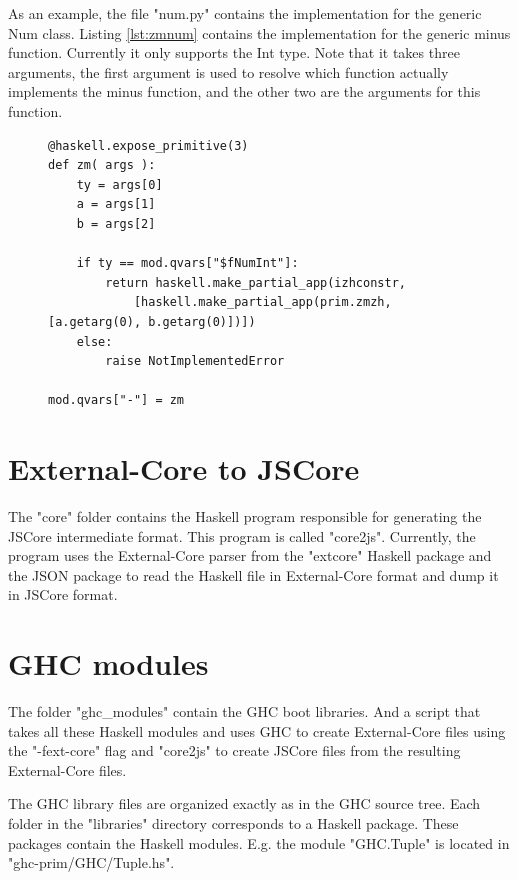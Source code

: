 As an example, the file "num.py" contains the implementation for the generic
Num class. Listing \ref{lst:zmnum} contains the implementation for the
generic minus function. Currently it only supports the Int type. Note that
it takes three arguments, the first argument is used to resolve which 
function actually implements the minus function, and the other two are the
arguments for this function.

\begin{figure}[H]
\lstset{ %
language=Python,
caption=Python function implementing the generic minus function.,
label=lst:zmnum
}
\begin{lstlisting}
@haskell.expose_primitive(3)
def zm( args ):
    ty = args[0]
    a = args[1]
    b = args[2]

    if ty == mod.qvars["$fNumInt"]:
        return haskell.make_partial_app(izhconstr,
            [haskell.make_partial_app(prim.zmzh, [a.getarg(0), b.getarg(0)])])
    else:
        raise NotImplementedError

mod.qvars["-"] = zm
\end{lstlisting}
\end{figure}

\section{External-Core to JSCore}

The "core" folder contains the Haskell program responsible for generating the
JSCore intermediate format. This program is called "core2js". Currently, the
program uses the External-Core parser from the "extcore" Haskell package and
the JSON package to read the Haskell file in External-Core format and dump it
in JSCore format.

\section{GHC modules}

The folder "ghc\_modules" contain the GHC boot libraries. And a script that 
takes all these Haskell modules and uses GHC to create External-Core files
using the "-fext-core" flag and "core2js" to create JSCore files from the 
resulting External-Core files.

The GHC library files are organized exactly as in the GHC source tree. Each
folder in the "libraries" directory corresponds to a Haskell package. These
packages contain the Haskell modules. E.g. the module "GHC.Tuple" is located
in "ghc-prim/GHC/Tuple.hs".

